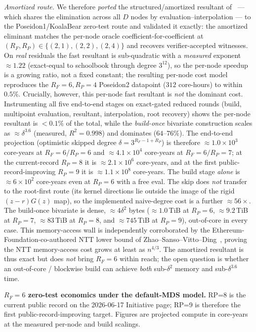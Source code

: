 \documentclass[11pt]{article}
\newcommand{\RF}{R_F}
\newcommand{\RP}{R_P}
\newcommand{\Verified}[1]{}
\newcommand{\Verified}[1]{\marginpar{\footnotesize\textcolor{blue}{[V: #1]}}}
\theoremstyle{plain}
\begin{document}
\begin{itemize}
\emph{Amortized route.} We therefore \emph{ported} the structured/amortized resultant of~\cite{cico2026} ---
which shares the elimination across all $D$ nodes by evaluation--interpolation ---
to the Poseidon1/KoalaBear zero-test route and validated it exactly: the amortized
eliminant matches the per-node oracle coefficient-for-coefficient at
$(\RF,\RP)\in\{(2,1),(2,2),(2,4)\}$ and recovers verifier-accepted witnesses. On
\emph{real} residuals the fast resultant is sub-quadratic with a \emph{measured}
exponent $\approx 1.22$ (exact-equal to schoolbook through degree $3^{12}$), so the
per-node speedup is a growing ratio, not a fixed constant; the resulting per-node
cost model reproduces the \cite{cico2026} $\RF=6,\RP=4$ Poseidon2 datapoint
($312$ core-hours) to within $0.5\%$. Crucially, however, this per-node fast resultant is \emph{not} the dominant cost.
Instrumenting all five end-to-end stages on exact-gated reduced rounds (build,
multipoint evaluation, resultant, interpolation, root recovery) shows the per-node
resultant is $<0.1\%$ of the total, while the \emph{build-once} bivariate
construction scales as $\approx\delta^{3.6}$ (measured, $R^2=0.998$) and dominates
($64$--$76\%$). The end-to-end projection (optimistic skipped degree
$\delta=3^{\RF-1+\RP}$) is therefore $\approx 1.0\times10^{3}$ core-years at
$\RF=6/\RP=6$ and $\approx 4.1\times10^{4}$ core-years at $\RF=6/\RP=7$; at the
current-record $\RP=8$ it is $\approx 2.1\times10^{6}$ core-years, and at the first
public-record-improving $\RP=9$ it is $\approx 1.1\times10^{8}$ core-years. The
build stage \emph{alone} is $\approx 6\times10^{2}$ core-years even at $\RP=6$ with
a free eval. The skip does \emph{not} transfer to
the root-first route (its kernel directions lie outside the image of the rigid
$(z-r)G(z)$ map), so the implemented naive-degree cost is a further $\approx 56\times$.
The build-once bivariate is dense, $\approx 4\delta^2$ bytes ($\approx 1.0$\,TiB at
$\RP=6$, $\approx 9.2$\,TiB at $\RP=7$, $\approx 83$\,TiB at $\RP=8$, and
$\approx 745$\,TiB at $\RP=9$), out-of-core in every case. This memory-access wall is independently
corroborated by the Ethereum-Foundation-co-authored NTT lower bound of
Zhao--Sanso--Vitto--Ding~\cite{nttlower}, proving the NTT memory-access cost grows
at least as $n^{4/3}$. The amortized resultant is thus exact but does \emph{not} bring
$\RF=6$ within reach; the open question is whether an out-of-core / blockwise build can
achieve \emph{both} sub-$\delta^2$ memory and sub-$\delta^{3.6}$ time.
\Verified{zt\_resultant\_fast; zt\_amortized\_spike;
artifacts/fast\_resultant\_scaling\_probe.json}
\begin{center}
\small
\textbf{$\RF=6$ zero-test economics under the default-MDS model.}
RP=8 is the current public record on the 2026-06-17 Initiative page; RP=9 is
therefore the first public-record-improving target. Figures are projected compute
in core-years at the measured per-node and build scalings.


\end{center}
\end{itemize}
\end{document}

